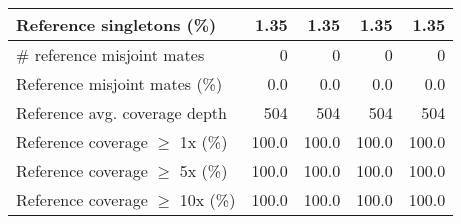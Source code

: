 \documentclass[12pt,a4paper]{article}
\begin{document}
\begin{table}[ht]
\begin{center}
\begin{tabular}{|l*{4}{|r}|}
Reference singletons (\%) & 1.35 & 1.35 & 1.35 & 1.35 \\ \hline
\# reference misjoint mates & 0 & 0 & 0 & 0 \\ \hline
Reference misjoint mates (\%) & 0.0 & 0.0 & 0.0 & 0.0 \\ \hline
Reference avg. coverage depth & 504 & 504 & 504 & 504 \\ \hline
Reference coverage $\geq$ 1x (\%) & 100.0 & 100.0 & 100.0 & 100.0 \\ \hline
Reference coverage $\geq$ 5x (\%) & 100.0 & 100.0 & 100.0 & 100.0 \\ \hline
Reference coverage $\geq$ 10x (\%) & 100.0 & 100.0 & 100.0 & 100.0 \\ \hline
\end{tabular}
\end{center}
\end{table}
\end{document}
